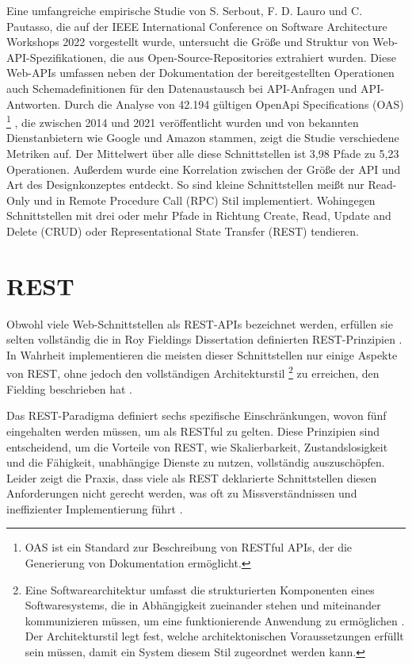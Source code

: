 \documentclass[draft,final]{vutinfth} %
\begin{document}
Eine umfangreiche empirische Studie von S. Serbout,  F. D. Lauro und C. Pautasso, die auf der IEEE International Conference on Software Architecture Workshops 2022 vorgestellt wurde, untersucht die Größe und Struktur von Web-API-Spezifikationen, die aus Open-Source-Repositories extrahiert wurden. Diese Web-APIs umfassen neben der Dokumentation der bereitgestellten Operationen auch Schemadefinitionen für den Datenaustausch bei API-Anfragen und API-Antworten. 
Durch die Analyse von 42.194 gültigen OpenApi Specifications (OAS)
\footnote{
	OAS ist ein Standard zur Beschreibung von RESTful APIs, der die Generierung von Dokumentation ermöglicht.
}
, die zwischen 2014 und 2021 veröffentlicht wurden und von bekannten Dienstanbietern wie Google und Amazon stammen, zeigt die Studie verschiedene Metriken auf. 
Der Mittelwert über alle diese Schnittstellen ist 3,98 Pfade zu 5,23 Operationen. 
Außerdem wurde eine Korrelation zwischen der Größe der API und Art des Designkonzeptes entdeckt. 
So sind kleine Schnittstellen meißt nur Read-Only und in Remote Procedure Call (RPC) Stil implementiert. 
Wohingegen Schnittstellen mit drei oder mehr Pfade in Richtung Create, Read, Update and Delete (CRUD) oder Representational State Transfer (REST) tendieren. \cite{Serbout:2022:WebApiStructures}


\section{REST}
\label{chap:rest}

Obwohl viele Web-Schnittstellen als REST-APIs bezeichnet werden, erfüllen sie selten vollständig die in Roy Fieldings Dissertation definierten REST-Prinzipien \cite{Neumann:2021:AnalysisOfRest}. 
In Wahrheit implementieren die meisten dieser Schnittstellen nur einige Aspekte von REST, ohne jedoch den vollständigen Architekturstil
\footnote{
	Eine Softwarearchitektur umfasst die strukturierten Komponenten eines Softwaresystems, die in Abhängigkeit zueinander stehen und miteinander kommunizieren müssen, um eine funktionierende Anwendung zu ermöglichen \cite{Fielding:2000:REST}. 
	Der Architekturstil legt fest, welche architektonischen Voraussetzungen erfüllt sein müssen, damit ein System diesem Stil zugeordnet werden kann.
}
zu erreichen, den Fielding beschrieben hat \cite{Neumann:2021:AnalysisOfRest}.

Das REST-Paradigma definiert sechs spezifische Einschränkungen, wovon fünf eingehalten werden müssen, um als RESTful zu gelten. 
Diese Prinzipien sind entscheidend, um die Vorteile von REST, wie Skalierbarkeit, Zustandslosigkeit und die Fähigkeit, unabhängige Dienste zu nutzen, vollständig auszuschöpfen. 
Leider zeigt die Praxis, dass viele als REST deklarierte Schnittstellen diesen Anforderungen nicht gerecht werden, was oft zu Missverständnissen und ineffizienter Implementierung führt \cite{Neumann:2021:AnalysisOfRest}.
\end{document}
